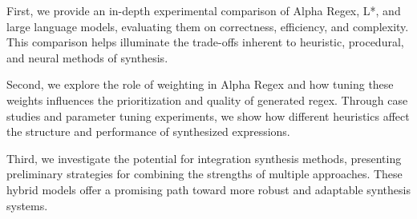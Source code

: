 \indent\indent First, we provide an in-depth experimental comparison of Alpha Regex, L*, and large language models, evaluating them on correctness, efficiency, and complexity. This comparison helps illuminate the trade-offs inherent to heuristic, procedural, and neural methods of synthesis.

\indent \indent Second, we explore the role of weighting in Alpha Regex and how tuning these weights influences the prioritization and quality of generated regex. Through case studies and parameter tuning experiments, we show how different heuristics affect the structure and performance of synthesized expressions. 

\indent \indent Third, we investigate the potential for integration synthesis methods, presenting preliminary strategies for combining the strengths of multiple approaches. These hybrid models offer a promising path toward more robust and adaptable synthesis systems.
